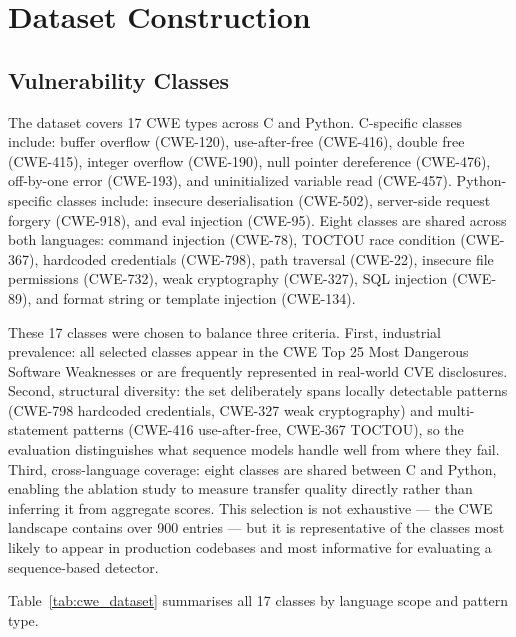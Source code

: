 \section{Dataset Construction}

\subsection{Vulnerability Classes}

The dataset covers 17 CWE types across C and Python.
C-specific classes include: buffer overflow (CWE-120), use-after-free (CWE-416),
double free (CWE-415), integer overflow (CWE-190), null pointer dereference (CWE-476),
off-by-one error (CWE-193), and uninitialized variable read (CWE-457).
Python-specific classes include: insecure deserialisation (CWE-502),
server-side request forgery (CWE-918), and eval injection (CWE-95).
Eight classes are shared across both languages: command injection (CWE-78),
TOCTOU race condition (CWE-367), hardcoded credentials (CWE-798), path traversal (CWE-22),
insecure file permissions (CWE-732), weak cryptography (CWE-327), SQL injection (CWE-89),
and format string or template injection (CWE-134).

These 17 classes were chosen to balance three criteria.
First, industrial prevalence: all selected classes appear in the CWE Top 25 Most Dangerous
Software Weaknesses or are frequently represented in real-world CVE disclosures.
Second, structural diversity: the set deliberately spans locally detectable patterns
(CWE-798 hardcoded credentials, CWE-327 weak cryptography) and multi-statement patterns
(CWE-416 use-after-free, CWE-367 TOCTOU), so the evaluation distinguishes what
sequence models handle well from where they fail.
Third, cross-language coverage: eight classes are shared between C and Python, enabling
the ablation study to measure transfer quality directly rather than inferring it from
aggregate scores.
This selection is not exhaustive --- the CWE landscape contains over 900 entries --- but
it is representative of the classes most likely to appear in production codebases and most
informative for evaluating a sequence-based detector.

Table~\ref{tab:cwe_dataset} summarises all 17 classes by language scope and pattern type.

